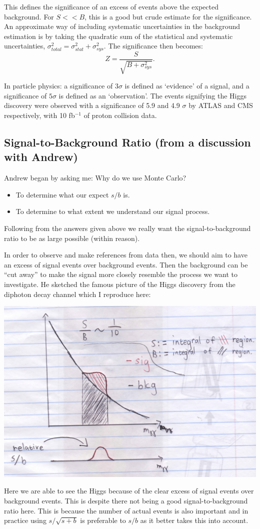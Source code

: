 \documentclass{article}
\begin{document}
This defines the significance of an excess of events above the expected background. For $ S << B$, this is a good but crude estimate for the significance. An approximate way of including systematic uncertainties in the background estimation is by taking the quadratic sum of the statistical and systematic uncertainties, $\sigma_{total}^{2} = \sigma_{stat}^{2} + \sigma_{sys}^{2}$. The significance then becomes:
$$ Z = \frac {S}{\sqrt{B+\sigma_{sys}^{2}}}.$$

In particle physics: a significance of $3 \sigma$ is defined as `evidence' of a signal, and a significance of $5 \sigma$ is defined as an `observation'. The events signifying the Higgs discovery were observed with a significance of 5.9 and 4.9 $\sigma$ by ATLAS and CMS respectively, with 10  fb$^{-1}$ of proton collision data.

\subsection{Signal-to-Background Ratio (from a discussion with Andrew)}
Andrew began by asking me: Why do we use Monte Carlo?
\begin{itemize}
\item To determine what our expect $s/b$ is.
\item To determine to what extent we understand our signal process.
\end{itemize}
Following from the answers given above we really want the signal-to-background ratio to be as large possible (within reason).

In order to observe and make references from data then, we should aim to have an excess of signal events over background events. Then the background can be ``cut away'' to make the signal more closely resemble the process we want to investigate. He sketched the famous picture of the Higgs discovery from the diphoton decay channel which I reproduce here:\\
\centerline{\includegraphics[scale=0.2]{higgs_disc.png}}
Here we are able to see the Higgs because of the clear excess of signal events over background events. This is despite there not being a good signal-to-background ratio here. This is because the number of actual events is also important and in practice using $s/\sqrt{s+b}$ is preferable to $s/b$ as it better takes this into account.
\end{document}
